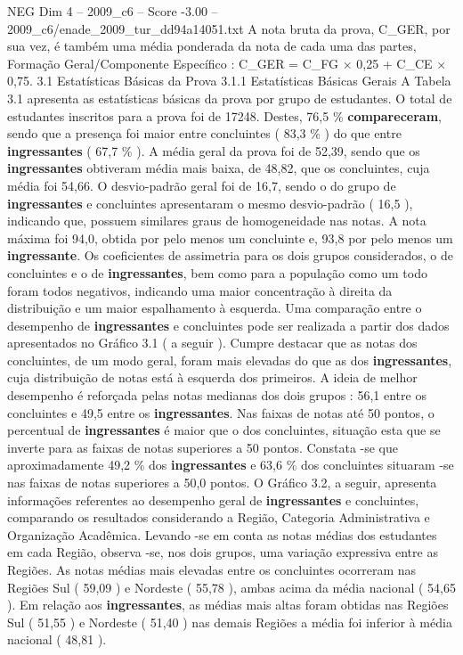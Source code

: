 \begin{textsample}{NEG Dim 4 – 2009\_c6 – Score -3.00 – 2009\_c6/enade\_2009\_tur\_dd94a14051.txt}
A nota bruta da prova, C\_GER, por sua vez, é também uma média ponderada da nota de cada uma das partes, Formação Geral/Componente Específico : C\_GER = C\_FG × 0,25 + C\_CE × 0,75. 3.1 Estatísticas Básicas da Prova 3.1.1 Estatísticas Básicas Gerais A Tabela 3.1 apresenta as estatísticas básicas da prova por grupo de estudantes.
O total de estudantes inscritos para a prova foi de 17248.
Destes, 76,5 \% \textbf{compareceram}, sendo que a presença foi maior entre concluintes ( 83,3 \% ) do que entre \textbf{ingressantes} ( 67,7 \% ).
A média geral da prova foi de 52,39, sendo que os \textbf{ingressantes} obtiveram média mais baixa, de 48,82, que os concluintes, cuja média foi 54,66.
O desvio-padrão geral foi de 16,7, sendo o do grupo de \textbf{ingressantes} e concluintes apresentaram o mesmo desvio-padrão ( 16,5 ), indicando que, possuem similares graus de homogeneidade nas notas.
A nota máxima foi 94,0, obtida por pelo menos um concluinte e, 93,8 por pelo menos um \textbf{ingressante}.
Os coeficientes de assimetria para os dois grupos considerados, o de concluintes e o de \textbf{ingressantes}, bem como para a população como um todo foram todos negativos, indicando uma maior concentração à direita da distribuição e um maior espalhamento à esquerda.
Uma comparação entre o desempenho de \textbf{ingressantes} e concluintes pode ser realizada a partir dos dados apresentados no Gráfico 3.1 ( a seguir ).
Cumpre destacar que as notas dos concluintes, de um modo geral, foram mais elevadas do que as dos \textbf{ingressantes}, cuja distribuição de notas está à esquerda dos primeiros.
A ideia de melhor desempenho é reforçada pelas notas medianas dos dois grupos : 56,1 entre os concluintes e 49,5 entre os \textbf{ingressantes}.
Nas faixas de notas até 50 pontos, o percentual de \textbf{ingressantes} é maior que o dos concluintes, situação esta que se inverte para as faixas de notas superiores a 50 pontos.
Constata -se que aproximadamente 49,2 \% dos \textbf{ingressantes} e 63,6 \% dos concluintes situaram -se nas faixas de notas superiores a 50,0 pontos.
O Gráfico 3.2, a seguir, apresenta informações referentes ao desempenho geral de \textbf{ingressantes} e concluintes, comparando os resultados considerando a Região, Categoria Administrativa e Organização Acadêmica.
Levando -se em conta as notas médias dos estudantes em cada Região, observa -se, nos dois grupos, uma variação expressiva entre as Regiões.
As notas médias mais elevadas entre os concluintes ocorreram nas Regiões Sul ( 59,09 ) e Nordeste ( 55,78 ), ambas acima da média nacional ( 54,65 ).
Em relação aos \textbf{ingressantes}, as médias mais altas foram obtidas nas Regiões Sul ( 51,55 ) e Nordeste ( 51,40 ) nas demais Regiões a média foi inferior à média nacional ( 48,81 ).

\end{textsample}
